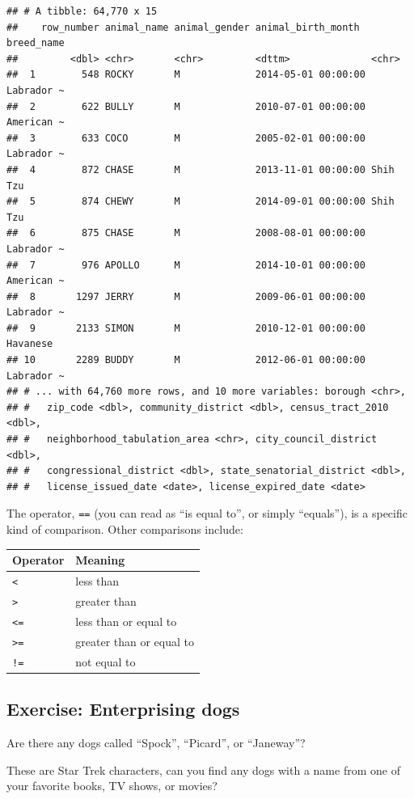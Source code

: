 \documentclass[]{Nemilov}
\begin{document}
\begin{verbatim}
## # A tibble: 64,770 x 15
##    row_number animal_name animal_gender animal_birth_month  breed_name
##         <dbl> <chr>       <chr>         <dttm>              <chr>     
##  1        548 ROCKY       M             2014-05-01 00:00:00 Labrador ~
##  2        622 BULLY       M             2010-07-01 00:00:00 American ~
##  3        633 COCO        M             2005-02-01 00:00:00 Labrador ~
##  4        872 CHASE       M             2013-11-01 00:00:00 Shih Tzu  
##  5        874 CHEWY       M             2014-09-01 00:00:00 Shih Tzu  
##  6        875 CHASE       M             2008-08-01 00:00:00 Labrador ~
##  7        976 APOLLO      M             2014-10-01 00:00:00 American ~
##  8       1297 JERRY       M             2009-06-01 00:00:00 Labrador ~
##  9       2133 SIMON       M             2010-12-01 00:00:00 Havanese  
## 10       2289 BUDDY       M             2012-06-01 00:00:00 Labrador ~
## # ... with 64,760 more rows, and 10 more variables: borough <chr>,
## #   zip_code <dbl>, community_district <dbl>, census_tract_2010 <dbl>,
## #   neighborhood_tabulation_area <chr>, city_council_district <dbl>,
## #   congressional_district <dbl>, state_senatorial_district <dbl>,
## #   license_issued_date <date>, license_expired_date <date>
\end{verbatim}

The operator, \texttt{==} (you can read as ``is equal to'', or simply ``equals''), is a specific kind of comparison. Other comparisons include:

\begin{longtable}[]{@{}ll@{}}
\toprule
Operator & Meaning\tabularnewline
\midrule
\endhead
\texttt{\textless{}} & less than\tabularnewline
\texttt{\textgreater{}} & greater than\tabularnewline
\texttt{\textless{}=} & less than or equal to\tabularnewline
\texttt{\textgreater{}=} & greater than or equal to\tabularnewline
\texttt{!=} & not equal to\tabularnewline
\bottomrule
\end{longtable}

\hypertarget{exercise-enterprising-dogs}{%
\subsection{Exercise: Enterprising dogs}\label{exercise-enterprising-dogs}}

Are there any dogs called ``Spock'', ``Picard'', or ``Janeway''?

These are Star Trek characters, can you find any dogs with a name from one of your favorite books, TV shows, or movies?
\end{document}
